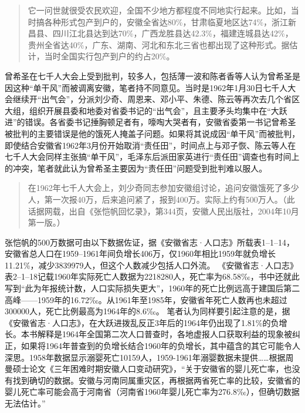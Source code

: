 \begin{quotation}它一问世就很受农民欢迎，全国不少地方都程度不同地实行起来。比如，当时搞各种形式包产到户的，安徽全省达80\%，甘肃临夏地区达74\%，浙江新昌县、四川江北县达到达70\%，广西龙胜县达42.3\%，福建连城县达42\%，贵州全省达40\%，广东、湖南、河北和东北三省也都出现了这种形式。据估计，当时全国实行包产到户的约占20\%。
\end{quotation}

曾希圣在七千人大会上受到批判，较多人，包括薄一波和陈者香等人认为曾希圣是因这种“单干风”而被调离安徽，笔者持不同意见。当时是1962年1月30日七千人大会继续开“出气会”，分派刘少奇、周恩来、邓小平、朱德、陈云等再次去几个省区大组，组织开展县委和地委对省委书记的“出气会”，且主要矛头均集中在“大跃进”的错误。各省委书记捶胸顿足者有，嚎啕大哭者有，安徽省委第一书记曾希圣被批判的主要错误是他的饿死人掩盖子问题。如果将其说成因“单干风”而被批判，即使结合安徽省1962年3月份开始取消“责任田”，时间点上与邓子恢、陈云等人在七千人大会同样主张搞“单干风”，毛泽东后派田家英进行“责任田”调查也有时间上的冲突，笔者就此认为曾希圣主要因为“责任田”问题受到批判难以服人。

\begin{quotation}在1962年七千人大会上，刘少奇同志参加安徽组讨论，追问安徽饿死了多少人，第一次报40万，后来追问紧了，报到400万。实际上约有500万人。（此话据网载，出自《张恺帆回忆录》，第344页，安徽人民出版社，2004年10月第一版。）
\end{quotation}

张恺帆的500万数据可由以下数据佐证，据《安徽省志·人口志》所载表1--1--14，安徽省总人口在1959--1961年间负增长406万，仅1960年相比1959年就负增长11.21\%，减少3839979人，但这个人数减少包括人口外流。 《安徽省志·人口志》表2--1--18记载1960年实际死亡人数据为2218280人，死亡率为68.58‰，书中还就此写到“此为年报统计数，人口实际损失更大”，1960年的死亡比例远高于建国后第二高峰——1959年的16.72‰。从1961年至1985年，安徽省年死亡人数再也未超过300000人，死亡比例最高为1964年的8.6‰。 笔者认为同样要引起注意的是，据《安徽省志·人口志》，在大跃进拨乱反正3年后的1964年仍出现了1.81\%的负增长。本书解释是1964年全国第二次人口普查时，各地虚报人口获取利益的现象被纠正，如果将1964年普查到的负增长结合1960年的负增长，其中蕴含的其它可能令人深思。1958年数据显示溺婴死亡10159人，1959-1961年溺婴数据未提供……根据周曼硕士论文《三年困难时期安徽人口变动研究》，“关于安徽省的婴儿死亡率，也没有找到确切的数据。安徽与河南同属重灾区，再根据两省死亡率的比较，安徽省的婴儿死亡率可能会高于河南省（河南省1960年婴儿死亡率为276.8‰），但确切数据无法估计。”


